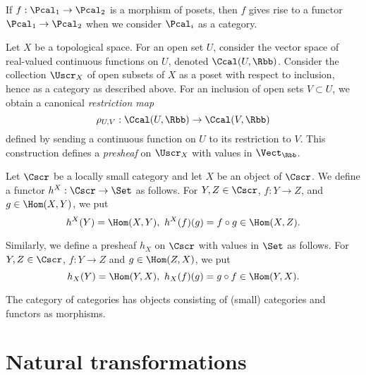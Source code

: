 \begin{example}
  If $f : \Pcal_{1} \to \Pcal_{2}$ is a morphism of posets, then $f$ gives rise to a functor $\Pcal_{1} \to \Pcal_{2}$ when we consider $\Pcal_{i}$ as a category.
\end{example}

\begin{example}
  Let $X$ be a topological space.
  For an open set $U$, consider the vector space of real-valued continuous functions on $U$, denoted $\Ccal(U,\Rbb)$.
  Consider the collection $\Uscr_{X}$ of open subsets of $X$ as a poset with respect to inclusion, hence as a category as described above.
  For an inclusion of open sets $V \subset U$, we obtain a canonical \emph{restriction map}
  \[ \rho_{U,V}: \Ccal(U,\Rbb) \to \Ccal(V,\Rbb) \]
  defined by sending a continuous function on $U$ to its restriction to $V$.
  This construction defines a \emph{presheaf} on $\Uscr_{X}$ with values in $\Vect_{\Rbb}$.
\end{example}

\begin{example}
  Let $\Cscr$ be a locally small category and let $X$ be an object of $\Cscr$.
  We define a functor $h^{X} : \Cscr \to \Set$ as follows.
  For $Y, Z \in \Cscr$, $f : Y \to Z$, and $g \in \Hom(X,Y)$, we put
  \[ h^{X}(Y) = \Hom(X,Y), \ h^{X}(f)(g) = f \circ g \in \Hom(X,Z). \]

  Similarly, we define a presheaf $h_{X}$ on $\Cscr$ with values in $\Set$ as follows.
  For $Y,Z \in \Cscr$, $f : Y \to Z$ and $g \in \Hom(Z,X)$, we put
  \[ h_{X}(Y) = \Hom(Y,X), \ h_{X}(f)(g) = g \circ f \in \Hom(Y,X). \]
\end{example}

\begin{example}
  The category of categories has objects consisting of (small) categories and functors as morphisms.
\end{example}

\section{Natural transformations}

